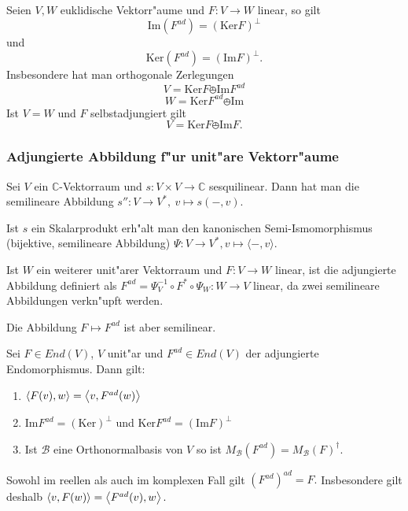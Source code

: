 \documentclass[9pt, a4paper, twocolumn, landscape]{article}
\begin{document}
\begin{theorem}
Seien $V, W$ euklidische Vektorr"aume und $F : V \rightarrow W$ linear, so gilt
$$
\mathrm{Im}(F^{ad}) = (\mathrm{Ker}F)^\perp
$$
und
 $$
\mathrm{Ker}(F^{ad}) = (\mathrm{Im}F)^\perp.
$$
Insbesondere hat man orthogonale Zerlegungen
$$
V = \mathrm{Ker} F \obot \mathrm{Im}F^{ad}
$$
$$
W = \mathrm{Ker}F^{ad} \obot \mathrm{Im}
$$
Ist $V = W$ und $F$ selbstadjungiert gilt
$$
V = \mathrm{Ker}F \obot \mathrm{Im}F.
$$

\end{theorem}

\subsubsection{Adjungierte Abbildung f"ur unit"are Vektorr"aume}
\begin{definition}
Sei $V$ ein $\mathbb{C}$-Vektorraum und $s : V \times V \rightarrow \mathbb{C}$ sesquilinear.
Dann hat man die semilineare Abbildung 
$
s'' : V \rightarrow V^*, \ v \mapsto s(-, v).
$

Ist $s$ ein Skalarprodukt erh"alt man den kanonischen Semi-Ismomorphismus (bijektive, semilineare Abbildung)
$
\Psi : V \rightarrow V^*, v \mapsto \langle - , v \rangle.
$

Ist $W$ ein weiterer unit"arer Vektorraum und $F : V \rightarrow W$ linear, ist die adjungierte Abbildung definiert als 
$
F^{ad} = \Psi^{-1}_V \circ F^* \circ \Psi_W  : W \rightarrow V
$
linear, da zwei semilineare Abbildungen verkn"upft werden.

Die Abbildung $ F \mapsto F^{ad}$ ist aber semilinear.
\end{definition}

\begin{theorem}
Sei $F \in End(V)$, $V$  unit"ar und $F^{ad} \in End(V)$ der adjungierte Endomorphismus. Dann gilt:
\begin{enumerate}
\item $\left\langle {F(v)} , {w} \right\rangle = \left\langle {v} , {F^{ad}(w)} \right\rangle$
\item $\mathrm{Im}F^{ad} = (\mathrm{Ker})^\perp$ und $\mathrm{Ker}F^{ad} = (\mathrm{Im}F)^\perp$
\item Ist $\mathcal{B}$ eine Orthonormalbasis von $V$ so ist
$
M_{\mathcal{B}}(F^{ad}) = M_\mathcal{B}(F)^\dagger.
$
\end{enumerate}
\end{theorem}

\begin{remark}
Sowohl im reellen als auch im komplexen Fall gilt 
$
(F^{ad})^{ad} = F.
$
Insbesondere gilt deshalb $\left\langle {v} , {F(w)} \right\rangle = \left\langle {F^{ad}(v)} , {w} \right\rangle.$
\end{remark}
\end{document}
